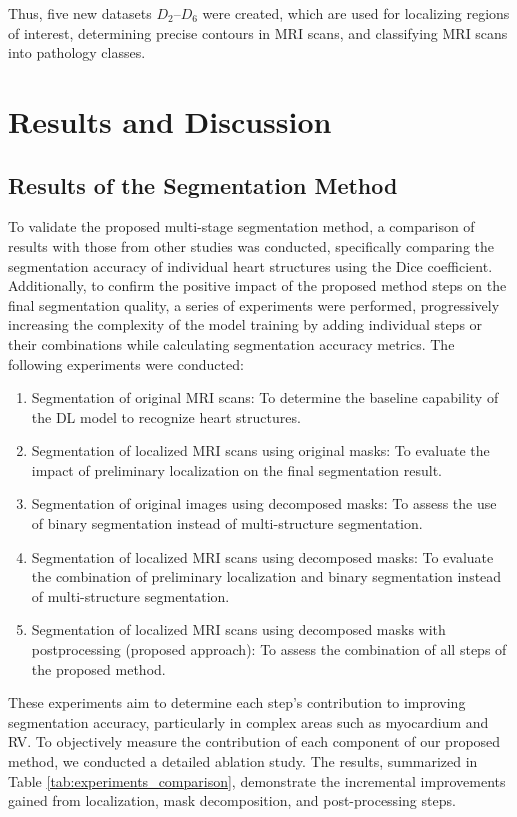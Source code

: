 \documentclass[fleqn,10pt]{wlscirep}
\begin{document}
Thus, five new datasets \({D_2}\)--\({D_6}\) were created, which are used for localizing regions of interest, determining precise contours in MRI scans, and classifying MRI scans into pathology classes.

\section*{Results and Discussion}

\subsection*{Results of the Segmentation Method}

To validate the proposed multi-stage segmentation method, a comparison of results with those from other studies was conducted, specifically comparing the segmentation accuracy of individual heart structures using the Dice coefficient. Additionally, to confirm the positive impact of the proposed method steps on the final segmentation quality, a series of experiments were performed, progressively increasing the complexity of the model training by adding individual steps or their combinations while calculating segmentation accuracy metrics. The following experiments were conducted:

\begin{enumerate}
    \item Segmentation of original MRI scans: To determine the baseline capability of the DL model to recognize heart structures.
    \item Segmentation of localized MRI scans using original masks: To evaluate the impact of preliminary localization on the final segmentation result.
    \item Segmentation of original images using decomposed masks: To assess the use of binary segmentation instead of multi-structure segmentation.
    \item Segmentation of localized MRI scans using decomposed masks: To evaluate the combination of preliminary localization and binary segmentation instead of multi-structure segmentation.
    \item Segmentation of localized MRI scans using decomposed masks with postprocessing (proposed approach): To assess the combination of all steps of the proposed method.
\end{enumerate}

These experiments aim to determine each step's contribution to improving segmentation accuracy, particularly in complex areas such as myocardium and RV.
To objectively measure the contribution of each component of our proposed method, we conducted a detailed ablation study. The results, summarized in Table \ref{tab:experiments_comparison}, demonstrate the incremental improvements gained from localization, mask decomposition, and post-processing steps.
\end{document}
